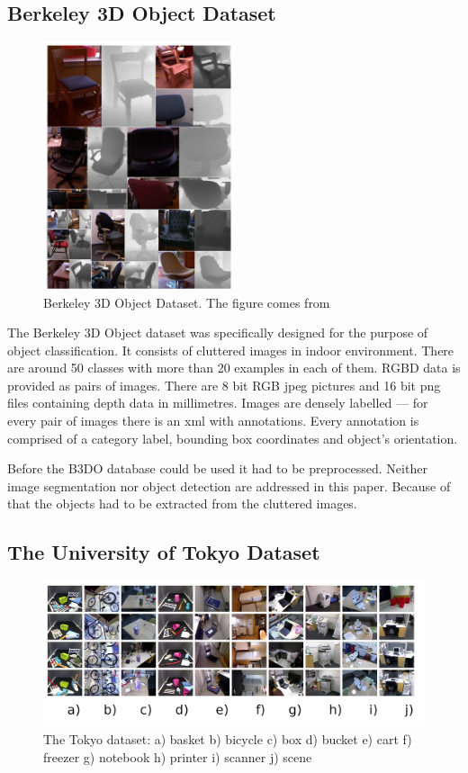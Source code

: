 	\subsection{Berkeley 3D Object Dataset}
	\begin{figure}[!ht]
	\centering
	\includegraphics[width=0.5\textwidth]{figs/b3do_dataset}
	\caption{Berkeley 3D Object Dataset. The figure comes from \cite{B3DO}}
	\label{fig:b3do}
	\end{figure}
	
	The Berkeley 3D Object dataset was specifically designed for the purpose of object classification. It consists of cluttered images in indoor environment. There are around 50 classes with more than 20 examples in each of them. RGBD data is provided as pairs of images. There are 8 bit RGB jpeg pictures and 16 bit png files containing depth data in millimetres. Images are densely labelled --- for every pair of images there is an xml with annotations. Every annotation is comprised of a category label, bounding box coordinates and object's orientation.

	Before the B3DO database could be used it had to be preprocessed. Neither image segmentation nor object detection are addressed in this paper. Because of that the objects had to be extracted from the cluttered images.

	\subsection{The University of Tokyo Dataset}	
	\begin{figure}[!ht]
	\centering
	\includegraphics[width=1\textwidth]{figs/tokyo_horizontal}
	\caption{The Tokyo dataset: a) basket b) bicycle c) box d) bucket e) cart f) freezer g) notebook h) printer i) scanner j) scene}
	\label{fig:tokyo}
	\end{figure}
	
